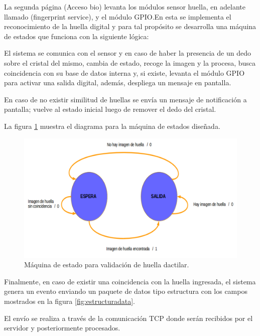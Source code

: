 La segunda página (Acceso bio) levanta los módulos sensor huella, en adelante llamado (fingerprint service), y el módulo GPIO.En esta se implementa el reconocimiento de la huella digital y para tal propósito se desarrolla una máquina de estados que funciona con la siguiente lógica:

El sistema se comunica con el sensor y  en caso de haber la presencia de un dedo sobre el cristal del mismo, cambia de estado, recoge la imagen y la procesa, busca coincidencia con su base de datos interna  y, si existe, levanta el módulo GPIO para activar una salida digital, además, despliega un mensaje en pantalla. 

En caso de no existir similitud de huellas se envía un mensaje de notificación a pantalla; vuelve al estado inicial luego de remover el dedo del cristal.

La figura \ref{fig:maquinabio} muestra el diagrama para la máquina de estados diseñada.

\begin{figure}[H]
	\centering
	\includegraphics[scale=.3]{./Figures/maquinabio.png}
	\caption{Máquina de estado para validación de huella dactilar.}
	\label{fig:maquinabio}
\end{figure}

Finalmente, en caso de existir una coincidencia con la huella ingresada, el sistema genera un evento enviando un paquete de datos tipo estructura con los campos mostrados en la figura \ref{fig:estructuradata}. 

El envío se realiza a través de la comunicación TCP donde serán recibidos por el servidor y posteriormente procesados.

